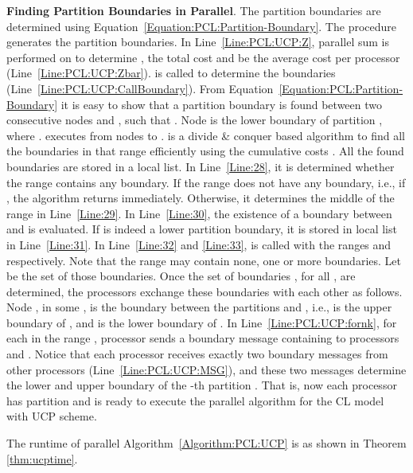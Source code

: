 \documentclass[conference,letterpaper,10pt]{IEEEtran}
\begin{document}
\vspace{0.5em}
\noindent\textbf{Finding Partition Boundaries in Parallel}. The partition boundaries are determined using Equation~\ref{Equation:PCL:Partition-Boundary}. The  procedure  generates the partition boundaries. In Line~\ref{Line:PCL:UCP:Z}, parallel sum is performed on  to determine , the total cost and  be the average cost per processor (Line~\ref{Line:PCL:UCP:Zbar}). 
 is called to determine the boundaries (Line~\ref{Line:PCL:UCP:CallBoundary}).
From  Equation~\ref{Equation:PCL:Partition-Boundary} it is easy to show that a partition boundary is found between two consecutive nodes  and , such that . Node  is the lower boundary of partition , where .
 executes  from nodes  to . 
 is a divide \& conquer based algorithm to find all the boundaries in that range efficiently using the cumulative costs . All the found boundaries are stored in a local list. In Line~\ref{Line:28}, it is determined whether the range contains any boundary. If the range does not have any boundary, i.e., if , the algorithm returns immediately. Otherwise, it determines the middle of the range  in Line~\ref{Line:29}. In Line~\ref{Line:30}, the existence of a boundary between  and  is evaluated. If  is indeed a lower partition boundary, it is stored in local list in Line~\ref{Line:31}. In Line~\ref{Line:32} and \ref{Line:33},  is called with the ranges  and  respectively.
Note that the range  may contain none, one or more boundaries. Let  be the set of those boundaries. 
Once the set of boundaries , for all , are determined, the processors exchange these boundaries with each other as follows. Node , in some , is the boundary between the partitions  and , i.e.,  is the upper boundary of , and  is the lower boundary of . In  Line~\ref{Line:PCL:UCP:fornk}, for each  in the range , processor  sends a boundary message containing  to processors  and . Notice that each processor  receives exactly two boundary messages from other processors (Line~\ref{Line:PCL:UCP:MSG}), and these two messages determine the lower and upper boundary of the -th partition . That is, now each processor  has  partition  and is ready to execute the parallel algorithm for the CL model with UCP scheme.

The runtime of parallel Algorithm~\ref{Algorithm:PCL:UCP}  is  as shown in Theorem \ref{thm:ucptime}.
\end{document}
